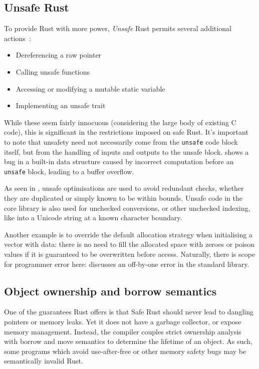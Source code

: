 \documentclass[dissertation.tex]{subfiles}
\begin{document}
\subsection{Unsafe Rust}
\label{sec:rust-unsafe}

To provide Rust with more power, \emph{Unsafe} Rust permits several
additional actions~\cite{rust-trpl-book}:

\begin{itemize}
    \item Dereferencing a raw pointer
    \item Calling unsafe functions
    \item Accessing or modifying a mutable static variable
    \item Implementing an unsafe trait
\end{itemize}

While these seem fairly innocuous (considering the large body of
existing C code), this is significant in the restrictions imposed on
safe Rust.
It's important to note that unsafety need not necessarily come from
the \texttt{unsafe} code block itself, but from the handling of inputs
and outputs to the unsafe block.
 shows a bug in a built-in data structure
caused by incorrect computation before an \texttt{unsafe} block, leading
to a buffer overflow.

As seen in , unsafe optimisations are used to
avoid redundant checks, whether they are duplicated or simply known to
be within bounds.
Unsafe code in the core library is also used for unchecked conversions,
or other unchecked indexing, like into a Unicode string at a known
character boundary.

Another example is to override the default allocation strategy
when initialising a vector with data: there is no need to fill the
allocated space with zeroes or poison values if it is guaranteed to be
overwritten before access.
Naturally, there is scope for programmer error here:
 discusses an off-by-one error in
the standard library.


\subsection{Object ownership and borrow semantics}
\label{sec:rust-borrow}


One of the guarantees Rust offers is that Safe Rust should never lead to
dangling pointers or memory leaks.
Yet it does not have a garbage collector, or expose memory management.
Instead, the compiler couples strict ownership analysis with borrow and
move semantics to determine the lifetime of an object.
As such, some programs which avoid use-after-free or other memory safety
bugs may be semantically invalid Rust.
\end{document}
